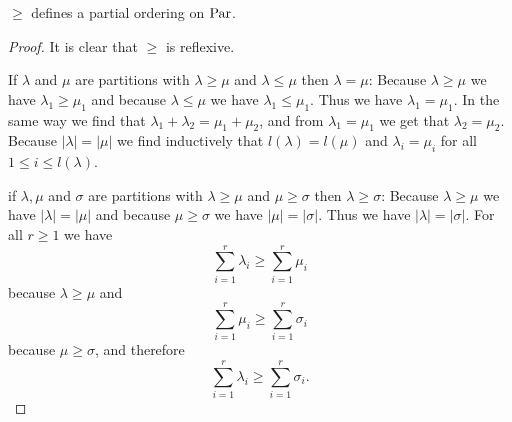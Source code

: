 \begin{lem}
 $\geq$ defines a partial ordering on $\operatorname{Par}$.
\end{lem}
\begin{proof}
 It is clear that $\geq$ is reflexive.
 
 If $\lambda$ and $\mu$ are partitions with $\lambda \geq \mu$ and $\lambda \leq \mu$ then $\lambda = \mu$: Because $\lambda \geq \mu$ we have $\lambda_1 \geq \mu_1$ and because $\lambda \leq \mu$ we have $\lambda_1 \leq \mu_1$. Thus we have $\lambda_1 = \mu_1$. In the same way we find that $\lambda_1 + \lambda_2 = \mu_1 + \mu_2$, and from $\lambda_1 = \mu_1$ we get that $\lambda_2 = \mu_2$. Because $|\lambda| = |\mu|$ we find inductively that $l(\lambda) = l(\mu)$ and $\lambda_i = \mu_i$ for all $1 \leq i \leq l(\lambda)$.
 
 if $\lambda, \mu$ and $\sigma$ are partitions with $\lambda \geq \mu$ and $\mu \geq \sigma$ then $\lambda \geq \sigma$: Because $\lambda \geq \mu$ we have $|\lambda| = |\mu|$ and because $\mu \geq \sigma$ we have $|\mu| = |\sigma|$. Thus we have $|\lambda| = |\sigma|$. For all $r \geq 1$ we have
 \[
  \sum_{i=1}^r \lambda_i \geq \sum_{i=1}^r \mu_i
 \]
 because $\lambda \geq \mu$ and
 \[
  \sum_{i=1}^r \mu_i \geq \sum_{i=1}^r \sigma_i
 \]
 because $\mu \geq \sigma$, and therefore
 \[
  \sum_{i=1}^r \lambda_i \geq \sum_{i=1}^r \sigma_i.
 \]
\end{proof}
 














